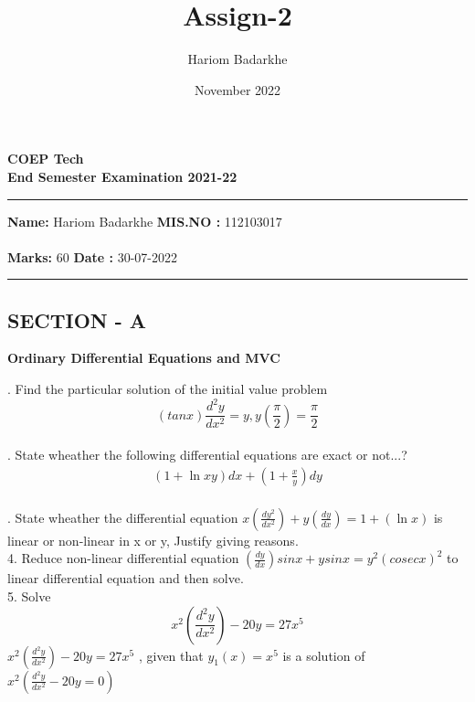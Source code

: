 \documentclass{article}
\title{Assign-2}
\author{Hariom Badarkhe}
\date{November 2022}
\begin{document}
\maketitle

\newpage
\begin{center}
\huge \bf {COEP Tech}
\vspace {7mm}\\
\large \textbf{End Semester Examination 2021-22}

\end{center}

\noindent\rule{\textwidth}{1.5pt}

\noindent \textbf {Name:} Hariom Badarkhe
\hfill \textbf{MIS.NO : }112103017\\\\
\noindent \textbf {Marks:} 60 \hfill \textbf{Date  : }30-07-2022

\noindent\rule{\textwidth}{1.5pt}

\vspace{5mm}
\subsection{SECTION - A}
\large \textbf{Ordinary Differential Equations and MVC}
\vspace{7mm}
 
. Find the particular solution of the initial value problem \\
$$ (tanx)\frac{d^2y}{dx^2} = y,y(\frac{\pi}{2})= \frac{\pi}{2} $$\\

. State wheather the following differential equations are \indent exact or not...?
\begin{align*}
(1+\ln xy)dx + (1+\frac{x}{y})dy\\
\end{align*}



. State wheather the differential equation $x(\frac{dy^2}{dx^2}) + y(\frac{dy}{dx}) = 1 + (\ln x)$ is  linear or non-linear in x or y, Justify giving reasons.\\

\large 4. Reduce non-linear differential equation  $(\frac{dy}{dx})sinx + y sinx = y^2(cosecx)^2 $ to linear differential equation and then solve.\\

\large 5. Solve 
\begin{equation*}
    x^2 (\frac{d^2y}{dx^2}) - 20y = 27x^5 
\end{equation*}
$x^2 (\frac{d^2y}{dx^2}) - 20y = 27x^5 $
, given that $y_1(x) = x^5$ is a solution of $x^2(\frac{d^2y}{dx^2} - 20y = 0)$
\end{document}

